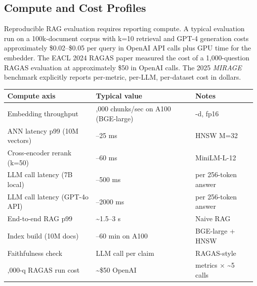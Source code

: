 \subsection{Compute and Cost Profiles}\label{compute-and-cost-profiles}

Reproducible RAG evaluation requires reporting compute. A typical evaluation run on a 100k-document corpus with k=10 retrieval and GPT-4 generation costs approximately \$0.02--\$0.05 per query in OpenAI API calls plus GPU time for the embedder. The EACL 2024 RAGAS paper measured the cost of a 1,000-question RAGAS evaluation at approximately \$50 in OpenAI calls. The 2025 \emph{MIRAGE} benchmark explicitly reports per-metric, per-LLM, per-dataset cost in dollars.

{\def\LTcaptype{none} %
\begin{longtable}[]{@{}
  >{\raggedright\arraybackslash}p{}
  >{\raggedright\arraybackslash}p{}
  >{\raggedright\arraybackslash}p{}@{}}
\toprule\noalign{}
\begin{minipage}[b]{\linewidth}\raggedright
Compute axis
\end{minipage} & \begin{minipage}[b]{\linewidth}\raggedright
Typical value
\end{minipage} & \begin{minipage}[b]{\linewidth}\raggedright
Notes
\end{minipage} \\
\midrule\noalign{}
\endhead
\bottomrule\noalign{}
\endlastfoot
Embedding throughput & 5,000 chunks/sec on A100 (BGE-large) & 1024-d, fp16 \\
ANN latency p99 (10M vectors) & 5--25 ms & HNSW M=32 \\
Cross-encoder rerank (k=50) & 30--60 ms & MiniLM-L-12 \\
LLM call latency (7B local) & 200--500 ms & per 256-token answer \\
LLM call latency (GPT-4o API) & 600--2000 ms & per 256-token answer \\
End-to-end RAG p99 & \textasciitilde1.5--3 s & Naive RAG \\
Index build (10M docs) & 30--60 min on A100 & BGE-large + HNSW \\
Faithfulness check & 1 LLM call per claim & RAGAS-style \\
1,000-q RAGAS run cost & \textasciitilde\$50 OpenAI & 4 metrics × \textasciitilde5 calls \\
\end{longtable}
}

